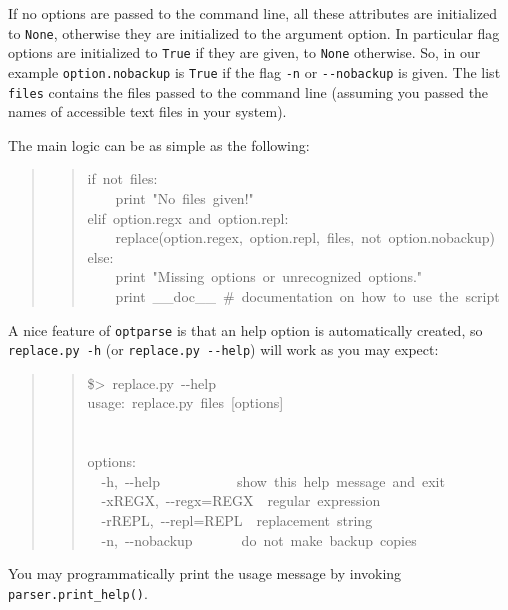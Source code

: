 \documentclass[10pt,a4paper,english]{article}
\begin{document}
If no options are passed to the command line, all these attributes
are initialized to \texttt{None}, otherwise they are initialized to 
the argument option. In particular flag options are initialized to 
\texttt{True} if they are given, to \texttt{None} otherwise. So, in our example 
\texttt{option.nobackup} is \texttt{True} if the flag \texttt{-n} or \texttt{-{}-nobackup} 
is given.
The list \texttt{files} contains the files passed
to the command line (assuming you passed
the names of accessible text files in your system).

The main logic can be as simple as the following:
\begin{quote}
\begin{quote}{\ttfamily \raggedright \noindent
if~not~files:~\\
~~~~print~"No~files~given!"~\\
elif~option.regx~and~option.repl:~\\
~~~~replace(option.regex,~option.repl,~files,~not~option.nobackup)~\\
else:~\\
~~~~print~"Missing~options~or~unrecognized~options."~\\
~~~~print~{\_}{\_}doc{\_}{\_}~{\#}~documentation~on~how~to~use~the~script
}\end{quote}
\end{quote}

A nice feature of \texttt{optparse} is that an help option is automatically
created, so \texttt{replace.py -h} (or  \texttt{replace.py -{}-help}) will work as
you may expect:
\begin{quote}
\begin{quote}{\ttfamily \raggedright \noindent
{\$}>~replace.py~-{}-help~\\
usage:~replace.py~files~{[}options]~\\
~\\
~\\
options:~\\
~~-h,~-{}-help~~~~~~~~~~~show~this~help~message~and~exit~\\
~~-xREGX,~-{}-regx=REGX~~regular~expression~\\
~~-rREPL,~-{}-repl=REPL~~replacement~string~\\
~~-n,~-{}-nobackup~~~~~~~do~not~make~backup~copies
}\end{quote}
\end{quote}

You may programmatically print the usage message by invoking  
\texttt{parser.print{\_}help()}.
\end{document}
